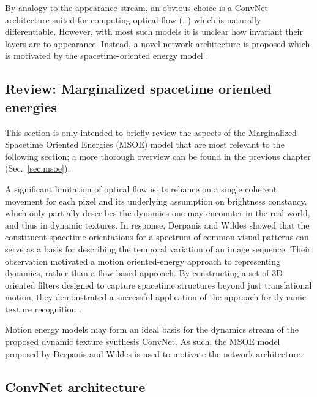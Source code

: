 By analogy to the appearance stream, an obvious choice
is a ConvNet architecture suited for computing
optical flow (\eg, \cite{dosovitskiy2015,ilg2017}) which
is naturally differentiable.
However, with most such models it is unclear how invariant
their layers are to appearance.
Instead, a novel network architecture is proposed which is
motivated by the spacetime-oriented energy model
\cite{derpanis2012spacetime,simoncelli1998}.

\subsection{Review: Marginalized spacetime oriented energies}

 This section is only intended to briefly review the aspects of the Marginalized Spacetime Oriented Energies (MSOE) model \cite{derpanis2012spacetime} that are most relevant to the following section; a more thorough overview can be found in the previous chapter (Sec.\ \ref{sec:msoe}).

A significant limitation of optical flow is its reliance on a single coherent movement for each pixel and its underlying assumption on brightness constancy, which only partially describes the dynamics one may encounter in the real world, and thus in dynamic textures. In response, Derpanis and Wildes \cite{derpanis2012spacetime} showed that the constituent
spacetime orientations for a spectrum of common
visual patterns can serve as a basis for describing the temporal
variation of an image sequence. Their observation motivated a motion oriented-energy approach to representing dynamics, rather than a flow-based approach. By constructing a set of 3D oriented filters designed to capture spacetime structures beyond just translational motion, they demonstrated a successful application of the approach for dynamic texture recognition \cite{derpanis2012spacetime}.

Motion energy models may form an ideal basis for the dynamics stream of the proposed dynamic texture synthesis ConvNet. As such, the MSOE model proposed by Derpanis and Wildes \cite{derpanis2012spacetime} is used to motivate the network architecture.

\subsection{ConvNet architecture}

